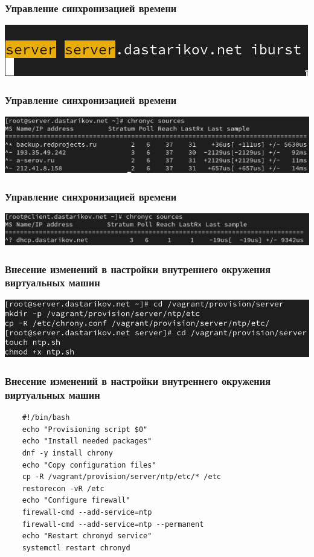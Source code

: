 \begin{frame}
\frametitle{Управление синхронизацией времени}
\centering
    \includegraphics[width=\textwidth]{../images/image12.png}
\end{frame}

\begin{frame}
\frametitle{Управление синхронизацией времени}
    \centering
    \includegraphics[width=\textwidth]{../images/image14.png}
\end{frame}

\begin{frame}
\frametitle{Управление синхронизацией времени}
    \centering
    \includegraphics[width=\textwidth]{../images/image15.png}
\end{frame}

\begin{frame}
\frametitle{Внесение изменений в настройки внутреннего окружения виртуальных машин}
    \centering
    \includegraphics[width=\textwidth]{../images/image16.png}
\end{frame}

\begin{frame}[fragile]
\frametitle{Внесение изменений в настройки внутреннего окружения виртуальных машин}
  \begin{verbatim}
    #!/bin/bash
    echo "Provisioning script $0"
    echo "Install needed packages"
    dnf -y install chrony
    echo "Copy configuration files"
    cp -R /vagrant/provision/server/ntp/etc/* /etc
    restorecon -vR /etc
    echo "Configure firewall"
    firewall-cmd --add-service=ntp
    firewall-cmd --add-service=ntp --permanent
    echo "Restart chronyd service"
    systemctl restart chronyd
  \end{verbatim}

\end{frame}

